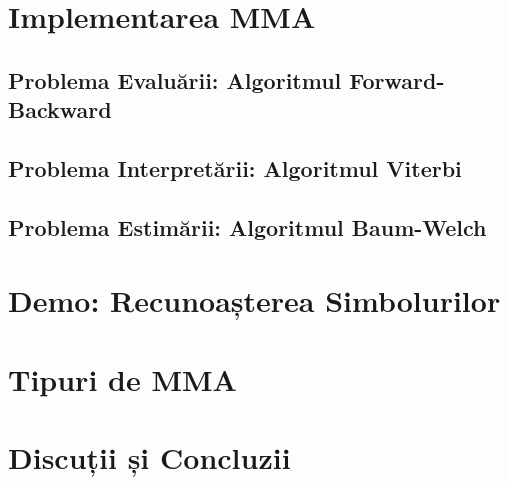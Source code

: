 \documentclass{beamer}
\begin{document}


\section{Implementarea MMA}
\label{sec:implementation}

\subsection{Problema Evaluării: Algoritmul Forward-Backward }
\label{sec:forward-backward}



\subsection{Problema Interpretării: Algoritmul Viterbi}
\label{sec:viterbi}



\subsection{Problema Estimării: Algoritmul Baum-Welch}
\label{sec:baum-welch}



\section{Demo: Recunoașterea Simbolurilor}
\label{sec:symbol-recognition}




\section{Tipuri de MMA}
\label{sec:hmm-types}



\section{Discuții și Concluzii}
\label{sec:closing}


\end{document}
